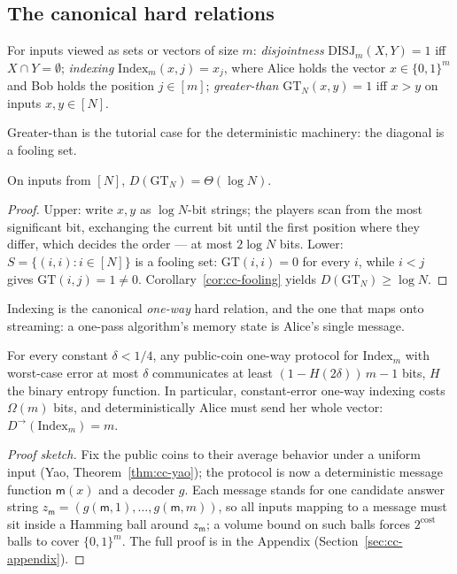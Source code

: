 \subsection{The canonical hard relations}
\label{sec:cc-relations}

\begin{definition}\label{def:cc-relations}
For inputs viewed as sets or vectors of size $m$:
\emph{disjointness} $\mathrm{DISJ}_m(X,Y) = 1$ iff $X \cap Y = \emptyset$;
\emph{indexing} $\mathrm{Index}_m(x,j) = x_j$, where Alice holds the vector $x \in
\{0,1\}^m$ and Bob holds the position $j \in [m]$;
\emph{greater-than} $\mathrm{GT}_N(x,y) = 1$ iff $x > y$ on inputs $x, y \in [N]$.
\end{definition}

Greater-than is the tutorial case for the deterministic machinery: the diagonal is a
fooling set.

\begin{proposition}\label{pro:cc-gt}
On inputs from $[N]$, $D(\mathrm{GT}_N) = \Theta(\log N)$. \eop
\end{proposition}

\begin{proof}
Upper: write $x, y$ as $\log N$-bit strings; the players scan from the most significant
bit, exchanging the current bit until the first position where they differ, which
decides the order --- at most $2\log N$ bits. Lower: $S = \{(i,i) : i \in [N]\}$ is a
fooling set: $\mathrm{GT}(i,i) = 0$ for every $i$, while $i < j$ gives
$\mathrm{GT}(i,j) = 1 \ne 0$. Corollary~\ref{cor:cc-fooling} yields
$D(\mathrm{GT}_N) \ge \log N$.
\end{proof}

Indexing is the canonical \emph{one-way} hard relation, and the one that maps onto
streaming: a one-pass algorithm's memory state is Alice's single message.

\begin{theorem}\label{thm:cc-index}
For every constant $\delta < 1/4$, any public-coin one-way protocol for
$\mathrm{Index}_m$ with worst-case error at most $\delta$ communicates at least
$(1 - H(2\delta))\,m - 1$ bits, $H$ the binary entropy function. In particular,
constant-error one-way indexing costs $\Omega(m)$ bits, and deterministically Alice
must send her whole vector: $D^{\rightarrow}(\mathrm{Index}_m) = m$. \eop
\end{theorem}

\begin{proof}[Proof sketch]
Fix the public coins to their average behavior under a uniform input (Yao,
Theorem~\ref{thm:cc-yao}); the protocol is now a deterministic message function
$\mathsf{m}(x)$ and a decoder $g$. Each message stands for one candidate answer string
$z_{\mathsf{m}} = (g(\mathsf{m},1),\dots,g(\mathsf{m},m))$, so all inputs mapping to a
message must sit inside a Hamming ball around $z_{\mathsf{m}}$; a volume bound on such
balls forces $2^{\text{cost}}$ balls to cover $\{0,1\}^m$. The full proof is in the
Appendix (Section~\ref{sec:cc-appendix}).
\end{proof}

